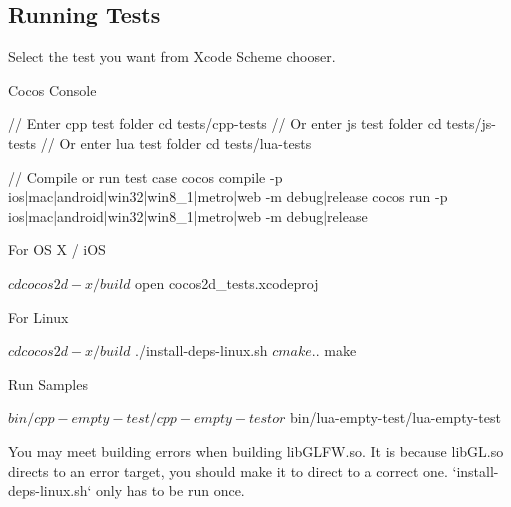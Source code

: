 \subsection*{Running Tests }

Select the test you want from Xcode Scheme chooser.


\begin{DoxyItemize}
\item Cocos Console
\end{DoxyItemize}


\begin{DoxyCode}
// Enter cpp test folder
cd tests/cpp-tests
// Or enter js test folder
cd tests/js-tests
// Or enter lua test folder
cd tests/lua-tests

// Compile or run test case
cocos compile -p ios|mac|android|win32|win8\_1|metro|web -m debug|release
cocos run -p ios|mac|android|win32|win8\_1|metro|web -m debug|release
\end{DoxyCode}



\begin{DoxyItemize}
\item For OS X / i\+OS
\end{DoxyItemize}


\begin{DoxyCode}
$ cd cocos2d-x/build
$ open cocos2d\_tests.xcodeproj
\end{DoxyCode}



\begin{DoxyItemize}
\item For Linux
\end{DoxyItemize}


\begin{DoxyCode}
$ cd cocos2d-x/build
$ ./install-deps-linux.sh
$ cmake ..
$ make
\end{DoxyCode}


Run Samples


\begin{DoxyCode}
$ bin/cpp-empty-test/cpp-empty-test
or
$ bin/lua-empty-test/lua-empty-test
\end{DoxyCode}
 \begin{DoxyVerb}  You may meet building errors when building libGLFW.so. It is because libGL.so directs to an error target,
  you should make it to direct to a correct one. `install-deps-linux.sh` only has to be run once.
\end{DoxyVerb}



